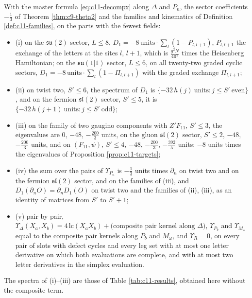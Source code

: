 \begin{proposition}
\label{prop:c11-masterfam}
With the master formula \eqref{eq:c11-decompx} along $\Delta$ and $P_n$, the sector coefficients $-\tfrac13$ of Theorem \ref{thm:c9-theta2} and the families and kinematics of Definition \ref{def:c11-families}, on the parts with the fewest fields:
\begin{itemize}
\item (i) on the $\mathfrak{su}(2)$ sector, $L\le8$, $D_1=-8\,\text{units}\cdot\sum_l(1-P_{l,l+1})$, $P_{l,l+1}$ the exchange of the letters at the sites $l$, $l+1$, which is $\frac{g^2N}{4\pi^2}$ times the Heisenberg Hamiltonian; on the $\mathfrak{su}(1|1)$ sector, $L\le6$, on all twenty-two graded cyclic sectors, $D_1=-8\,\text{units}\cdot\sum_l(1-\Pi_{l,l+1})$ with the graded exchange $\Pi_{l,l+1}$;
\item (ii) on twist two, $S'\le6$, the spectrum of $D_1$ is $\{-32\,h(j)\ \text{units}: j\le S'\ \text{even}\}$, and on the fermion $\mathfrak{sl}(2)$ sector, $S'\le5$, it is $\{-32\,h(j+1)\ \text{units}: j\le S'\ \text{odd}\}$;
\item (iii) on the family of two gaugino components with $Z'F_{11}$, $S'\le3$, the eigenvalues are $0$, $-48$, $-\tfrac{200}3$ units, on the gluon $\mathfrak{sl}(2)$ sector, $S'\le2$, $-48$, $-\tfrac{200}3$ units, and on $(F_{11},\psi)$, $S'\le4$, $-48$, $-\tfrac{200}3$, $-\tfrac{392}5$ units: $-8$ units times the eigenvalues of Proposition \ref{prop:c11-targets};
\item (iv) the sum over the pairs of $\Upsilon_{P_n}$ is $-\tfrac13$ units times $\partial_n$ on twist two and on the fermion $\mathfrak{sl}(2)$ sector, and on the families of (iii), and $D_1(\partial_nO)=\partial_nD_1(O)$ on twist two and the families of (ii), (iii), as an identity of matrices from $S'$ to $S'+1$;
\item (v) pair by pair, $\Upsilon_\Delta(X_a,X_b)=4\,\mathrm{lc}(X_aX_b)+\big(\text{composite pair kernel along }\Delta\big)$, $\Upsilon_{P_b}$ and $\Upsilon_{M_\omega}$ equal to the composite pair kernels along $P_b$ and $M_\omega$, and $\Upsilon_R=0$, on every pair of slots with defect cycles and every leg set with at most one letter derivative on which both evaluations are complete, and with at most two letter derivatives in the simplex evaluation.
\end{itemize}
The spectra of (i)--(iii) are those of Table \ref{tab:c11-results}, obtained here without the composite term.
\end{proposition}

